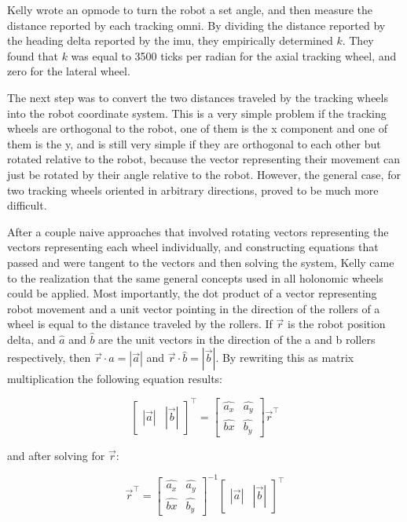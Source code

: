 \documentclass{article}
\begin{document}
Kelly wrote an opmode to turn the robot a set angle, and then measure the distance reported by each tracking omni. By dividing the distance reported by the heading delta reported by the imu, they empirically determined $k$. They found that $k$ was equal to 3500 ticks per radian for the axial tracking wheel, and zero for the lateral wheel. 

The next step was to convert the two distances traveled by the tracking wheels into the robot coordinate system. This is a very simple problem if the tracking wheels are orthogonal to the robot, one of them is the x component and one of them is the y, and is still very simple if they are orthogonal to each other but rotated relative to the robot, because the vector representing their movement can just be rotated by their angle relative to the robot. However, the general case, for two tracking wheels oriented in arbitrary directions, proved to be much more difficult. 

After a couple naive approaches that involved rotating vectors representing the vectors representing each wheel individually, and constructing equations that passed and were tangent to the vectors and then solving the system, Kelly came to the realization that the same general concepts used in all holonomic wheels could be applied. Most importantly, the dot product of a vector representing robot movement and a unit vector pointing in the direction of the rollers of a wheel is equal to the distance traveled by the rollers. If $\vec{r}$ is the robot position delta, and $\hat{a}$ and $\hat{b}$ are the unit vectors in the direction of the a and b rollers respectively, then $\vec{r} \cdot \hat{a} = |\vec{a}|$ and $\vec{r} \cdot \hat{b} = |\vec{b}|$. By rewriting this as matrix multiplication the following equation results: 

$$\begin{bmatrix} |\vec{a}| & |\vec{b}| \end{bmatrix}^\top = \begin{bmatrix} \hat{a_x} & \hat{a_y} \\ \hat{b
x} & \hat{b_y} \end{bmatrix} \vec{r}^\top$$

and after solving for $\vec{r}$:

$$\vec{r}^\top = \begin{bmatrix} \hat{a_x} & \hat{a_y} \\ \hat{b
x} & \hat{b_y} \end{bmatrix}^{-1}  \begin{bmatrix} |\vec{a}| & |\vec{b}| \end{bmatrix}^\top $$
\end{document}
